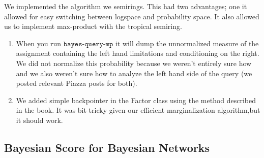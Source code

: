 \documentclass[11pt,a4paper]{article}
\begin{document}
	We implemented the algorithm we semirings. This had two advantages;
one it allowed for easy switching between logspace and probability
space. It also allowed us to implement max-product with the tropical
semiring.
\begin{enumerate}
	\item When you run $\texttt{bayes-query-mp}$ it will dump the
unnormalized measure of the assignment containing the left hand
limitations and conditioning on the right. We did not normalize this
probability because we weren't entirely sure how and we also weren't
sure how to analyze the left hand side of the query (we posted
relevant Piazza posts for both).
	\item We added simple backpointer in the Factor class using the
method described in the book. It was bit tricky given our efficient
marginalization algorithm,but it should work.
\end{enumerate}
	
	\subsection{Bayesian Score for Bayesian Networks}
	
\end{document}
